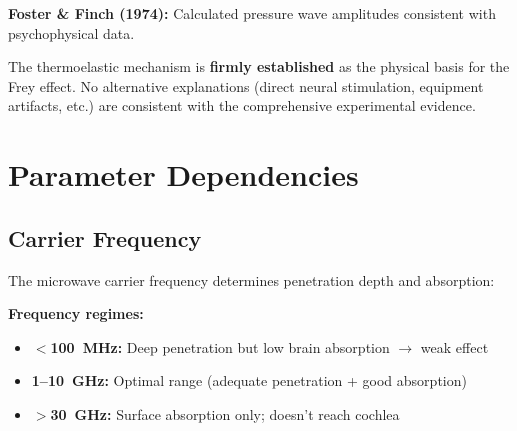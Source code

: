 \textbf{Foster \& Finch (1974):} Calculated pressure wave amplitudes consistent with psychophysical data.

\begin{keyconcept}
The thermoelastic mechanism is \textbf{firmly established} as the physical basis for the Frey effect. No alternative explanations (direct neural stimulation, equipment artifacts, etc.) are consistent with the comprehensive experimental evidence.
\end{keyconcept}

\section{Parameter Dependencies}

\subsection{Carrier Frequency}

The microwave carrier frequency determines penetration depth and absorption:

\begin{center}
\end{center}

\textbf{Frequency regimes:}
\begin{itemize}
\item \textbf{$<$100~MHz:} Deep penetration but low brain absorption $\rightarrow$ weak effect
\item \textbf{1--10~GHz:} Optimal range (adequate penetration + good absorption)
\item \textbf{$>$30~GHz:} Surface absorption only; doesn't reach cochlea
\end{itemize}

